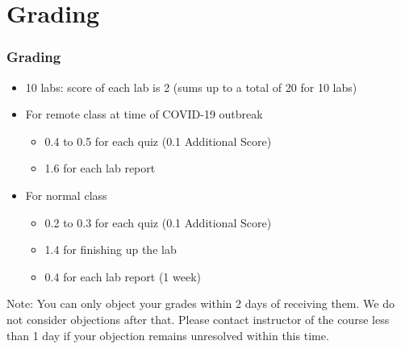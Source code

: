 \documentclass[aspectratio=169,15pt]{beamer}
\begin{document}
\section{Grading}
\begin{frame}
    \frametitle{Grading}

    \begin{itemize}
        \item 10 labs: score of each lab is \alert{2} (sums up to a total of \alert{20} for 10 labs)
        \item For remote class at time of \alert{COVID-19} outbreak
              \begin{itemize}
                  \item {\color{red} 0.4} to {\color{red} 0.5} for each quiz (0.1 Additional Score)
                  \item {\color{red} 1.6} for each lab report
              \end{itemize}
        \item For normal class
              \begin{itemize}
                  \item {\color{red} 0.2} to {\color{red} 0.3} for each quiz (0.1 Additional Score)
                  \item {\color{red} 1.4} for finishing up the lab
                  \item {\color{red} 0.4} for each lab report (1 week)
              \end{itemize}
    \end{itemize}
    \begin{alertblock}{Note:}
        You can only object your grades within {\color{red} 2 days} of receiving them. We do not consider objections after that.
        Please contact instructor of the course less than {\color{red} 1 day} if your objection remains unresolved within this time.
    \end{alertblock}

\end{frame}
\end{document}
